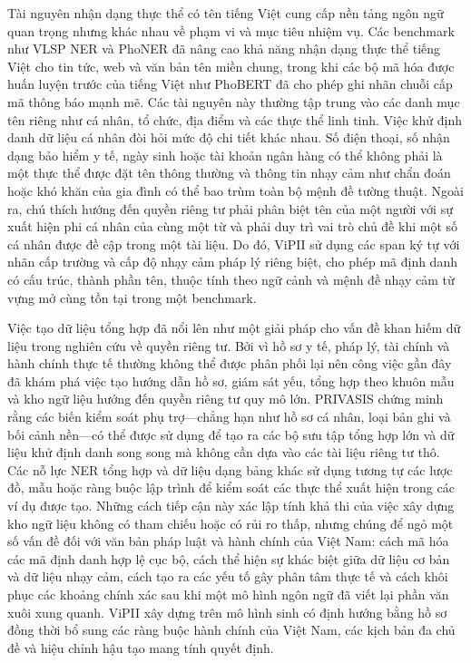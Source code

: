 \documentclass[
  11pt,
  a4paper,
]{article}
\begin{document}
Tài nguyên nhận dạng thực thể có tên tiếng Việt cung cấp nền tảng ngôn
ngữ quan trọng nhưng khác nhau về phạm vi và mục tiêu nhiệm vụ. Các
benchmark như VLSP NER và PhoNER đã nâng cao khả năng nhận dạng thực thể
tiếng Việt cho tin tức, web và văn bản tên miền chung, trong khi các bộ
mã hóa được huấn luyện trước của tiếng Việt như PhoBERT đã cho phép ghi
nhãn chuỗi cấp mã thông báo mạnh mẽ. Các tài nguyên này thường tập trung
vào các danh mục tên riêng như cá nhân, tổ chức, địa điểm và các thực
thể linh tinh. Việc khử định danh dữ liệu cá nhân đòi hỏi mức độ chi
tiết khác nhau. Số điện thoại, số nhận dạng bảo hiểm y tế, ngày sinh
hoặc tài khoản ngân hàng có thể không phải là một thực thể được đặt tên
thông thường và thông tin nhạy cảm như chẩn đoán hoặc khó khăn của gia
đình có thể bao trùm toàn bộ mệnh đề tường thuật. Ngoài ra, chú thích
hướng đến quyền riêng tư phải phân biệt tên của một người với sự xuất
hiện phi cá nhân của cùng một từ và phải duy trì vai trò chủ đề khi một
số cá nhân được đề cập trong một tài liệu. Do đó, ViPII sử dụng các span
ký tự với nhãn cấp trường và cấp độ nhạy cảm pháp lý riêng biệt, cho
phép mã định danh có cấu trúc, thành phần tên, thuộc tính theo ngữ cảnh
và mệnh đề nhạy cảm từ vựng mở cùng tồn tại trong một benchmark.

Việc tạo dữ liệu tổng hợp đã nổi lên như một giải pháp cho vấn đề khan
hiếm dữ liệu trong nghiên cứu về quyền riêng tư. Bởi vì hồ sơ y tế, pháp
lý, tài chính và hành chính thực tế thường không thể được phân phối lại
nên công việc gần đây đã khám phá việc tạo hướng dẫn hồ sơ, giám sát
yếu, tổng hợp theo khuôn mẫu và kho ngữ liệu hướng đến quyền riêng tư
quy mô lớn. PRIVASIS chứng minh rằng các biến kiểm soát phụ trợ---chẳng
hạn như hồ sơ cá nhân, loại bản ghi và bối cảnh nền---có thể được sử
dụng để tạo ra các bộ sưu tập tổng hợp lớn và dữ liệu khử định danh song
song mà không cần dựa vào các tài liệu riêng tư thô. Các nỗ lực NER tổng
hợp và dữ liệu dạng bảng khác sử dụng tương tự các lược đồ, mẫu hoặc
ràng buộc lập trình để kiểm soát các thực thể xuất hiện trong các ví dụ
được tạo. Những cách tiếp cận này xác lập tính khả thi của việc xây dựng
kho ngữ liệu không có tham chiếu hoặc có rủi ro thấp, nhưng chúng để ngỏ
một số vấn đề đối với văn bản pháp luật và hành chính của Việt Nam: cách
mã hóa các mã định danh hợp lệ cục bộ, cách thể hiện sự khác biệt giữa
dữ liệu cơ bản và dữ liệu nhạy cảm, cách tạo ra các yếu tố gây phân tâm
thực tế và cách khôi phục các khoảng chính xác sau khi một mô hình ngôn
ngữ đã viết lại phần văn xuôi xung quanh. ViPII xây dựng trên mô hình
sinh có định hướng bằng hồ sơ đồng thời bổ sung các ràng buộc hành chính
của Việt Nam, các kịch bản đa chủ đề và hiệu chỉnh hậu tạo mang tính
quyết định.
\end{document}

